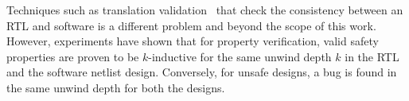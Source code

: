 %
Techniques such as translation validation~\cite{DBLP:conf/tacas/PnueliSS98}  
that check the consistency between an RTL and software is a different problem 
and beyond the scope of this work.
%
However, experiments have shown that for 
property verification, valid safety properties are proven to be $k$-inductive for 
the same unwind depth $k$ in the RTL and the software netlist design.  Conversely, 
for unsafe designs, a bug is found in the same unwind depth for both the designs.
